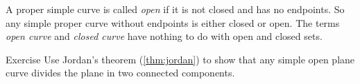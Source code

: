 A proper simple curve is called \emph{open} if it is not closed and has no endpoints.
So any simple proper curve without endpoints is either closed or open.
The terms \textit{open curve} and \textit{closed curve} have nothing to do with open and closed sets.

\begin{thm}{Exercise}\label{ex:proper-curve}
Use Jordan's theorem (\ref{thm:jordan}) to show that any simple open plane curve divides the plane in two connected components.  
\end{thm}



